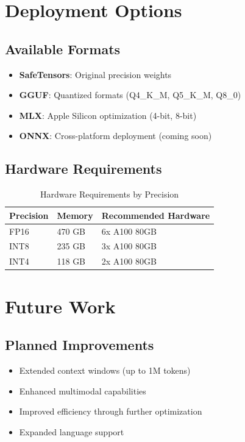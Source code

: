 \documentclass[11pt,a4paper]{article}
\begin{document}
\section{Deployment Options}

\subsection{Available Formats}
\begin{itemize}
    \item \textbf{SafeTensors}: Original precision weights
    \item \textbf{GGUF}: Quantized formats (Q4\_K\_M, Q5\_K\_M, Q8\_0)
    \item \textbf{MLX}: Apple Silicon optimization (4-bit, 8-bit)
    \item \textbf{ONNX}: Cross-platform deployment (coming soon)
\end{itemize}

\subsection{Hardware Requirements}
\begin{table}[H]
\centering
\begin{tabular}{lll}
\toprule
\textbf{Precision} & \textbf{Memory} & \textbf{Recommended Hardware} \\
\midrule
FP16 & 470 GB & 6x A100 80GB \\
INT8 & 235 GB & 3x A100 80GB \\
INT4 & 118 GB & 2x A100 80GB \\
\bottomrule
\end{tabular}
\caption{Hardware Requirements by Precision}
\end{table}

\section{Future Work}

\subsection{Planned Improvements}
\begin{itemize}
    \item Extended context windows (up to 1M tokens)
    \item Enhanced multimodal capabilities
    \item Improved efficiency through further optimization
    \item Expanded language support
\end{itemize}
\end{document}
